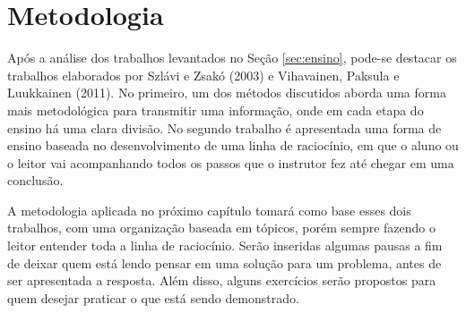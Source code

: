 
\chapter{Metodologia}
\label{chap:metodo}
Após a análise dos trabalhos levantados no Seção \ref{sec:ensino}, pode-se destacar os trabalhos elaborados por Szlávi e Zsakó (2003) e Vihavainen, Paksula e Luukkainen (2011). No primeiro, um dos métodos discutidos aborda uma forma mais metodológica para transmitir uma informação, onde em cada etapa do ensino há uma clara divisão. No segundo trabalho é apresentada uma forma de ensino baseada no desenvolvimento de uma linha de raciocínio, em que o aluno ou o leitor vai acompanhando todos os passos que o instrutor fez até chegar em uma conclusão.

A metodologia aplicada no próximo capítulo tomará como base esses dois trabalhos, com uma organização baseada em tópicos, porém sempre fazendo o leitor entender toda a linha de raciocínio. Serão inseridas algumas pausas a fim de deixar quem está lendo pensar em uma solução para um problema, antes de ser apresentada a resposta. Além disso, alguns exercícios serão propostos para quem desejar praticar o que está sendo demonstrado.

